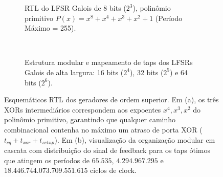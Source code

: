\documentclass{article}
\begin{document}
\begin{figure}[p]
  \centering
  \begin{subfigure}{\linewidth}\centering
    \resizebox{0.82\linewidth}{!}{}
    \caption{RTL do LFSR Galois de 8 bits ($2^3$), polinômio primitivo $P(x) = x^8 + x^4 + x^3 + x^2 + 1$ (Período Máximo = 255).}
  \end{subfigure}\\[2mm]
  \begin{subfigure}{\linewidth}\centering
    \resizebox{0.78\linewidth}{!}{}
    \caption{Estrutura modular e mapeamento de taps dos LFSRs Galois de alta largura: 16 bits ($2^4$), 32 bits ($2^5$) e 64 bits ($2^6$).}
  \end{subfigure}
  \caption{Esquemáticos RTL dos geradores de ordem superior.
    Em (a), os três XORs intermediários correspondem aos expoentes $x^4, x^3, x^2$ do polinômio primitivo,
    garantindo que qualquer caminho combinacional contenha no máximo um atraso de porta XOR ($t_{cq} + t_{xor} + t_{setup}$).
    Em (b), visualização da organização modular em cascata com distribuição do sinal de feedback para os taps ótimos
    que atingem os períodos de $65.535$, $4.294.967.295$ e $18.446.744.073.709.551.615$ ciclos de clock.}
  \label{fig:rtl_galois_8_64}
\end{figure}
\end{document}
